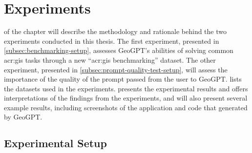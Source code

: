 \chapter{Experiments}
\label{cha:experiments}

 of the  chapter will describe the methodology and rationale behind the two experiments conducted in this thesis. The first experiment, presented in \autoref{subsec:benchmarking-setup}, assesses GeoGPT's abilities of solving common \acrshort{acr:gis} tasks through a new \enquote{\acrshort{acr:gis} benchmarking} dataset. The other experiment, presented in \autoref{subsec:prompt-quality-test-setup}, will assess the importance of the quality of the prompt passed from the user to GeoGPT.  lists the datasets used in the experiments.  presents the experimental results and offers interpretations of the findings from the experiments, and will also present several example results, including screenshots of the application and code that generated by GeoGPT.

\section{Experimental Setup}
\label{sec:experimental-setup}

\begin{comment}
Trying and failing is a major part of research. However, to have a chance of success you need a plan driving the experimental research, just as you need a plan for your literature search. Further, plans are made to be revised and this revision ensures that any further decisions made are in line with the work already completed.

The plan should include what experiments or series of experiments are planned and what questions the individual or set of experiments aim to answer. Such questions should be connected to your research questions, so that in the evaluation of your results you can discuss the results wrt to the research questions.
\end{comment}

\begin{comment}
The experimental setup should include all data --- parameters, etc. --- that would allow a person to repeat your experiments.
This will thus be the actual instantiation for each experiment of the general architecture described in Chapter~\ref{cha:architecture}.
\end{comment}

